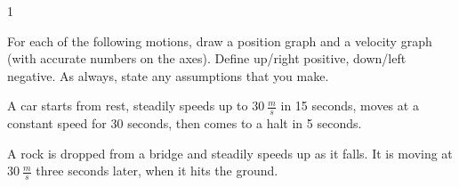 
\AddToShipoutPicture*{\BackgroundPic}

\addtocounter {ProbNum} {1}

 
{\bf \Large{}} For each of the following motions, draw a position graph and a velocity graph (with accurate numbers on the axes). Define up/right positive, down/left negative. As always, state any assumptions that you make.\bigskip

A car starts from rest, steadily speeds up to ${30~\tfrac{m}{s}}$ in 15 seconds, moves at a constant speed for 30 seconds, then comes to a halt in 5 seconds.
\vfill

A rock is dropped from a bridge and steadily speeds up as it falls. It is moving at ${30~\tfrac{m}{s}}$ three seconds later, when it hits the ground.

\vfill



\newpage